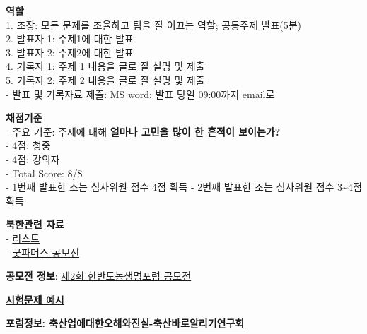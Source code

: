 \documentclass[]{book}
\begin{document}
\textbf{역할}\\
1. 조장: 모든 문제를 조율하고 팀을 잘 이끄는 역할; 공통주제 발표(5분)\\
2. 발표자 1: 주제1에 대한 발표\\
3. 발표자 2: 주제2에 대한 발표\\
4. 기록자 1: 주제 1 내용을 글로 잘 설명 및 제출\\
5. 기록자 2: 주제 2 내용을 글로 잘 설명 및 제출\\
- 발표 및 기록자료 제출: MS word; 발표 당일 09:00까지 email로

\textbf{채점기준}\\
- 주요 기준: 주제에 대해 \textbf{얼마나 고민을 많이 한 흔적이
보이는가?}\\
- 4점: 청중\\
- 4점: 강의자\\
- Total Score: 8/8\\
- 1번째 발표한 조는 심사위원 점수 4점 획득 - 2번째 발표한 조는 심사위원
점수 3\textasciitilde{}4점 획득

\textbf{북한관련 자료}\\
- \href{https://github.com/YoungjunNa/aes/blob/master/NK.pdf}{리스트}\\
-
\href{http://www.good-farmers.org/single-post/2018/06/11/\%EA\%B5\%BF\%ED\%8C\%8C\%EB\%A8\%B8\%EC\%8A\%A4-\%EC\%A0\%9C1\%ED\%9A\%8C-\%ED\%95\%9C\%EB\%B0\%98\%EB\%8F\%84\%EB\%86\%8D\%EC\%83\%9D\%EB\%AA\%85-\%EA\%B3\%B5\%EB\%AA\%A8\%EC\%A0\%84-\%EC\%88\%98\%EC\%83\%81\%EC\%9E\%91}{굿파머스
공모전}

\textbf{공모전 정보}:
\href{http://www.good-farmers.org/single-post/2018/03/21/\%EC\%A0\%9C2\%ED\%9A\%8C-\%ED\%95\%9C\%EB\%B0\%98\%EB\%8F\%84\%EB\%86\%8D\%EC\%83\%9D\%EB\%AA\%85\%ED\%8F\%AC\%EB\%9F\%BC-\%EA\%B3\%B5\%EB\%AA\%A8\%EC\%A0\%84-\%EC\%95\%88\%EB\%82\%B4}{제2회
한반도농생명포럼 공모전}

\textbf{\href{https://github.com/YoungjunNa/aes/blob/master/2019-\%E1\%84\%83\%E1\%85\%A9\%E1\%86\%BC\%E1\%84\%86\%E1\%85\%AE\%E1\%86\%AF\%E1\%84\%92\%E1\%85\%AA\%E1\%86\%AB\%E1\%84\%80\%E1\%85\%A7\%E1\%86\%BC\%E1\%84\%92\%E1\%85\%A1\%E1\%86\%A8-\%E1\%84\%8C\%E1\%85\%AE\%E1\%86\%BC\%E1\%84\%80\%E1\%85\%A1\%E1\%86\%AB\%E1\%84\%80\%E1\%85\%A9\%E1\%84\%89\%E1\%85\%A1-\%E1\%84\%8B\%E1\%85\%A8\%E1\%84\%89\%E1\%85\%B5.docx}{시험문제
예시}}

\textbf{\href{https://github.com/YoungjunNa/aes/raw/master/2019-\%E1\%84\%8E\%E1\%85\%AE\%E1\%86\%A8\%E1\%84\%89\%E1\%85\%A1\%E1\%86\%AB\%E1\%84\%8B\%E1\%85\%A5\%E1\%86\%B8\%E1\%84\%8B\%E1\%85\%A6\%E1\%84\%83\%E1\%85\%A2\%E1\%84\%92\%E1\%85\%A1\%E1\%86\%AB\%E1\%84\%8B\%E1\%85\%A9\%E1\%84\%92\%E1\%85\%A2\%E1\%84\%8B\%E1\%85\%AA\%E1\%84\%8C\%E1\%85\%B5\%E1\%86\%AB\%E1\%84\%89\%E1\%85\%B5\%E1\%86\%AF-\%E1\%84\%8E\%E1\%85\%AE\%E1\%86\%A8\%E1\%84\%89\%E1\%85\%A1\%E1\%86\%AB\%E1\%84\%87\%E1\%85\%A1\%E1\%84\%85\%E1\%85\%A9\%E1\%84\%8B\%E1\%85\%A1\%E1\%86\%AF\%E1\%84\%85\%E1\%85\%B5\%E1\%84\%80\%E1\%85\%B5\%E1\%84\%8B\%E1\%85\%A7\%E1\%86\%AB\%E1\%84\%80\%E1\%85\%AE\%E1\%84\%92\%E1\%85\%AC.pdf}{포럼정보:
축산업에대한오해와진실-축산바로알리기연구회}}
\end{document}

